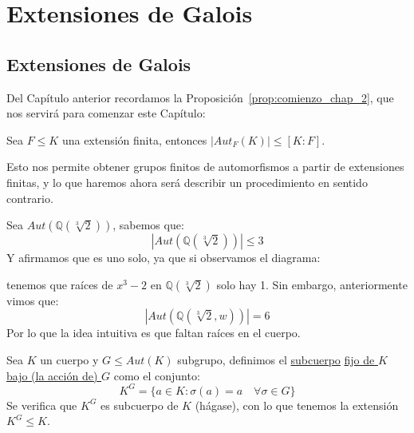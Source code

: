 \chapter{Extensiones de Galois}
\section{Extensiones de Galois}
\noindent
Del Capítulo anterior recordamos la Proposición~\ref{prop:comienzo_chap_2}, que nos servirá para comenzar este Capítulo:

\begin{center}
    Sea $F\leq K$ una extensión finita, entonces $|Aut_F(K)| \leq [K:F]$.
\end{center}

\noindent
Esto nos permite obtener grupos finitos de automorfismos a partir de extensiones finitas, y lo que haremos ahora será describir un procedimiento en sentido contrario.

\begin{ejemplo}
    Sea $Aut\left(\mathbb{Q}\left(\sqrt[3]{2}\right)\right)$, sabemos que:
    \begin{equation*}
        \left|Aut\left(\mathbb{Q}\left(\sqrt[3]{2}\right)\right)\right| \leq 3
    \end{equation*}
    Y afirmamos que es uno solo, ya que si observamos el diagrama:
    \begin{figure}[H]
        \centering
    \end{figure}
    \noindent
    tenemos que raíces de $x^3-2$ en $\mathbb{Q}\left(\sqrt[3]{2}\right)$ solo hay 1. Sin embargo, anteriormente vimos que:
    \begin{equation*}
        \left|Aut\left(\mathbb{Q}\left(\sqrt[3]{2},w\right)\right)\right| = 6
    \end{equation*}
    Por lo que la idea intuitiva es que faltan raíces en el cuerpo.
\end{ejemplo}

\begin{definicion}
    Sea $K$ un cuerpo y $G\leq Aut(K)$ subgrupo, definimos el \underline{subcuerpo} \underline{fijo de $K$ bajo (la acción de) $G$} como el conjunto:
    \begin{equation*}
        K^G = \{a\in K : \sigma(a) = a \quad \forall \sigma\in G\}
    \end{equation*}
    Se verifica que $K^G$ es subcuerpo de $K$ (hágase), con lo que tenemos la extensión $K^G\leq K$.
\end{definicion}

